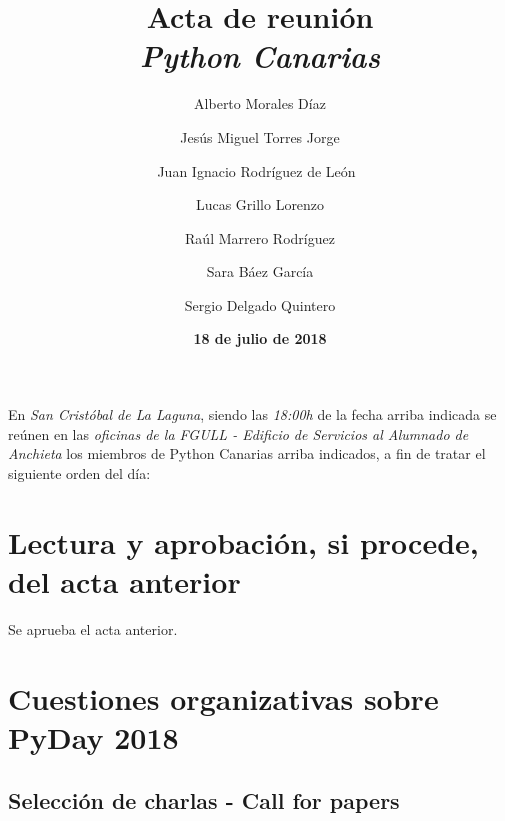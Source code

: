 \documentclass[a4paper, 12pt]{article}
\title{\huge \textbf{Acta de reunión} \\ \textit{Python Canarias}}
\date{\textbf{18 de julio de 2018}}
\author{
        Alberto Morales Díaz \and
        Jesús Miguel Torres Jorge \and
        Juan Ignacio Rodríguez de León\ \and 
        Lucas Grillo Lorenzo \and
        Raúl Marrero Rodríguez \and
        Sara Báez García \and
        Sergio Delgado Quintero
    }
\begin{document}
    
    \renewcommand{\contentsname}{Orden del día}
    
    \maketitle
    
    En \textit{San Cristóbal de La Laguna}, siendo las \textit{18:00h} de la fecha arriba indicada se reúnen en las \textit{oficinas de la FGULL - Edificio de Servicios al Alumnado de Anchieta} los miembros de Python Canarias arriba indicados, a fin de tratar el siguiente orden del día:
    
    \tableofcontents
    
    \section{Lectura y aprobación, si procede, del acta anterior}
    
    Se aprueba el acta anterior.
    
    \section{Cuestiones organizativas sobre PyDay 2018}
    
    \subsection*{Selección de charlas - Call for papers}
    
\end{document}
